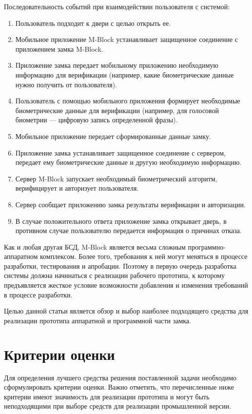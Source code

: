 Последовательность событий при взаимодействии пользователя с системой:
\begin{enumerate}
\item Пользователь подходит к двери с целью открыть ее.
\item Мобильное приложение M-Block устанавливает защищенное соединение с приложением замка M-Block.
\item Приложение замка передает мобильному приложению необходимую информацию для верификации (например, какие биометрические данные нужно получить от пользователя).
\item Пользователь с помощью мобильного приложения формирует необходимые биометрические данные для верификации (например, для голосовой биометрии --- цифровую запись определенной фразы).
\item Мобильное приложение передает сформированные данные замку.
\item Приложение замка устанавливает защищенное соединение с сервером, передает ему биометрические данные и другую необходимую информацию.
\item Сервер M-Block запускает необходимый биометрический алгоритм, верифицирует и авторизует пользователя.
\item Сервер сообщает приложению замка результаты верификации и авторизации.
\item В случае положительного ответа приложение замка открывает дверь, в противном случае пользователю передается информация о причинах отказа.
\end{enumerate}

Как и любая другая БСД, M-Block является весьма сложным программно-аппаратном комплексом. Более того,  требования к ней могут меняться в процессе разработки, тестирования и апробации. Поэтому в первую очередь разработка системы должна начинаться  с реализации рабочего прототипа, к которому предъявляется жесткое условие возможности добавления и изменения требований в процессе разработки.

Целью данной статьи является обзор и выбор наиболее подходящего средства для реализации прототипа аппаратной и программной части замка.

\section{Критерии оценки}
Для определения лучшего средства решения поставленной задачи необходимо сформулировать критерии оценки. Важно отметить, что перечисленные ниже критерии имеют значимость для реализации прототипа и могут быть неподходящими при выборе средств для реализации промышленной версии.


